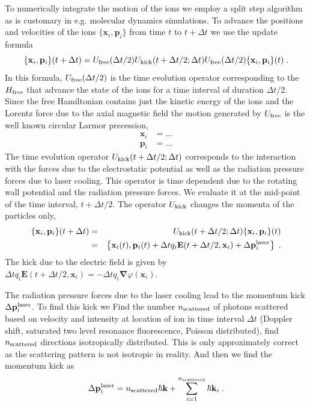 \documentclass[aps, pra, preprint]{revtex4-1}
\newcommand{\hfree}{H_{\rm free}}
\begin{document}
To numerically integrate the motion of the ions we employ a split
step algorithm as is customary in e.g. molecular dynamics
simulations. To advance the positions and velocities of the ions
$\{\mathbf{x}_i, \mathbf{p}_i\}$
from time $t$ to $t + \Delta t$ we use the update formula
\begin{equation}
  \{\mathbf{x}_i, \mathbf{p}_i\}(t+\Delta t) =
  U_{\rm free}(\Delta t /2)
  U_{\rm kick}(t + \Delta t / 2; \Delta t)
  U_{\rm free}(\Delta t /2)
  \{\mathbf{x}_i, \mathbf{p}_i\}(t)\;.
\end{equation}
In this formula, $U_{\rm free}(\Delta t/2)$ is the time evolution
operator corresponding to the $\hfree$ that advance the state of
the ions for a time interval of duration $\Delta t / 2$. Since
the free Hamiltonian contains just the kinetic energy of the ions
and the Lorentz force due to the axial magnetic field the motion
generated by $U_{\rm free}$ is the well known circular Larmor
precession,
\begin{eqnarray}
  \mathbf{x}_i &= \ldots\\
  \mathbf{p}_i &= \ldots
\end{eqnarray}
The time evolution operator $U_{\rm kick}(t + \Delta t/2; \Delta
t)$ corresponds to the interaction with the forces due to the
electrostatic potential as well as the radiation pressure forces
due to laser cooling. This operator is time dependent due to the
rotating wall potential and the radiation pressure forces. We
evaluate it at the mid-point of the time interval, $t + \Delta t
/ 2$. The operator $U_{\rm kick}$ changes the momenta of the
particles only,
\begin{eqnarray}
  \{\mathbf{x}_i, \mathbf{p}_i\}(t + \Delta t)
  &=& U_{\rm kick}(t + \Delta t /2; \Delta t)
    \{\mathbf{x}_i, \mathbf{p}_i\}(t)\\
  &=&\left\{
      \mathbf{x}_i(t),
      \mathbf{p}_i(t) +
      \Delta t q_i \mathbf{E}(t + \Delta t / 2, \mathbf{x}_i) +
      \Delta \mathbf{p}_i^{\rm laser}
      \right\}\;.
\end{eqnarray}
The kick due to the electric field is given by $\Delta t
q_i\mathbf{E}(t+\Delta t /2,\mathbf{x}_i) = -\Delta t
q_i\mathbf{\nabla}\varphi(\mathbf{x}_i)$.

The radiation pressure forces due to the laser cooling lead to
the momentum kick $\Delta \mathbf{p}_i^{\rm laser}$. To find this
kick we Find the number $n_{\rm scattered}$ of photons scattered
based on velocity and intensity at location of ion in time
interval $\Delta t$ (Doppler shift, saturated two level resonance
fluorescence, Poisson distributed), find $n_{\rm scattered}$ directions isotropically
distributed. This is only approximately correct as the scattering
pattern is not isotropic in reality. And then we find the
momentum kick as
\begin{equation}
\Delta \mathbf{p}_i^{\rm laser} = n_{\rm scattered}\hbar
\mathbf{k} + \sum_{i=1}^{n_{\rm scattered}} \hbar \mathbf{k}_i\;.
\end{equation}
\end{document}
